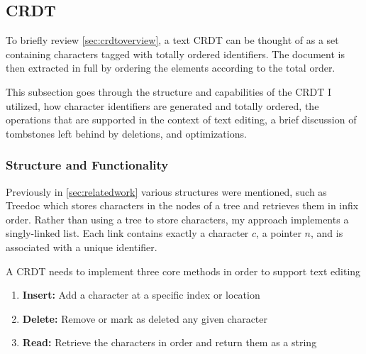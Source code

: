 \documentclass[12pt,a4paper,twoside,openright]{report}
\begin{document}
	
	\subsection{CRDT}
		To briefly review \cref{sec:crdtoverview}, a text CRDT can be thought of as a set containing characters tagged with totally ordered identifiers. The document is then extracted in full by ordering the elements according to the total order. 
		
		This subsection goes through the structure and capabilities of the CRDT I utilized, how character identifiers are generated and totally ordered, the operations that are supported in the context of text editing, a brief discussion of tombstones left behind by deletions, and optimizations.
		
		\subsubsection{Structure and Functionality}
		Previously in \cref{sec:relatedwork} various structures were mentioned, such as Treedoc which stores characters in the nodes of a tree and retrieves them in infix order. Rather than using a tree to store characters, my approach implements a singly-linked list. Each link contains exactly a character $c$, a pointer $n$, and is associated with a unique identifier.
		
		A CRDT needs to implement three core methods in order to support text editing
		\begin{enumerate}
			\item \textbf{Insert:} Add a character at a specific index or location
			\item \textbf{Delete:} Remove or mark as deleted any given character
			\item \textbf{Read:} Retrieve the characters in order and return them as a string
		\end{enumerate} 
		
\end{document}
